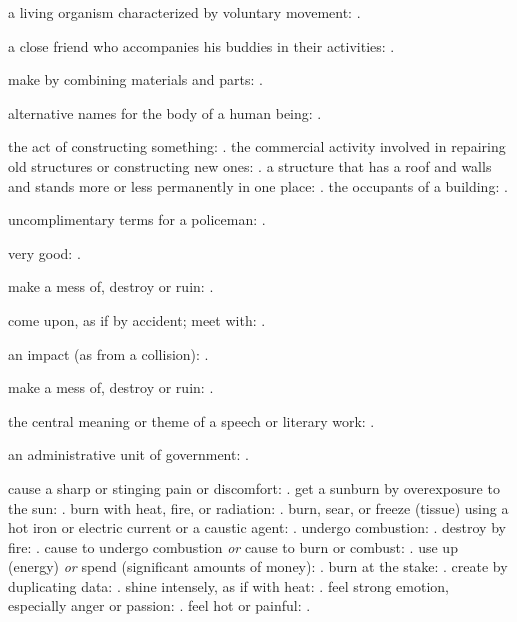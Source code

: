   a living organism characterized by voluntary movement: .

  a close friend who accompanies his buddies in their activities: .

  make by combining materials and parts: .

  alternative names for the body of a human being: .

  the act of constructing something: . the commercial activity involved in repairing old structures or constructing new ones: . a structure that has a roof and walls and stands more or less permanently in one place: . the occupants of a building: .

  uncomplimentary terms for a policeman: .

  very good: .

  make a mess of, destroy or ruin: .

  come upon, as if by accident; meet with: .

  an impact (as from a collision): .

  make a mess of, destroy or ruin: .

  the central meaning or theme of a speech or literary work: .

  an administrative unit of government: .

  cause a sharp or stinging pain or discomfort: . get a sunburn by overexposure to the sun: . burn with heat, fire, or radiation: . burn, sear, or freeze (tissue) using a hot iron or electric current or a caustic agent: . undergo combustion: . destroy by fire: . cause to undergo combustion \textit{or} cause to burn or combust: . use up (energy) \textit{or} spend (significant amounts of money): . burn at the stake: . create by duplicating data: . shine intensely, as if with heat: . feel strong emotion, especially anger or passion: . feel hot or painful: .

